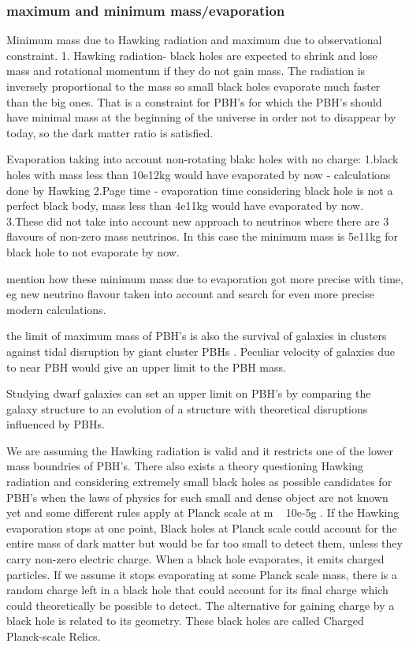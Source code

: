 \documentclass{article}
\begin{document}
\subsubsection {maximum and minimum mass/evaporation}
Minimum mass due to Hawking radiation and maximum due to observational constraint.
1. Hawking radiation- black holes are expected to shrink and lose mass and rotational momentum if they do not gain mass. The radiation is inversely proportional to the mass so small black holes evaporate much faster than the big ones. That is a constraint for PBH's for which the PBH's should have minimal mass at the beginning of the universe in order not to disappear by today, so the dark matter ratio is satisfied. 

Evaporation taking into account non-rotating blakc holes with no charge:
1.black holes with mass less than 10e12kg would have evaporated by now - calculations done by Hawking 
2.Page time - evaporation time considering black hole is not a perfect black body, mass less than 4e11kg would have evaporated by now. 
3.These did not take into account new approach to neutrinos where there are 3 flavours of non-zero mass neutrinos. In this case the minimum mass is 5e11kg for black hole to not evaporate by now. 

mention how these minimum mass due to evaporation got more precise with time, eg new neutrino flavour taken into account and search for even more precise modern calculations.

the limit of maximum mass of PBH's is also the survival of galaxies in clusters against tidal disruption by giant cluster PBHs \cite{PBH_as_DM_candidate}. Peculiar velocity of galaxies due to near PBH would give an upper limit to the PBH mass. 

Studying dwarf galaxies can set an upper limit on PBH's by comparing the galaxy structure to an evolution of a structure with theoretical disruptions influenced by PBHs. 


We are assuming the Hawking radiation is valid and it restricts one of the lower mass boundries of PBH's. There also exists a theory questioning Hawking radiation and considering extremely small black holes as possible candidates for PBH's when the laws of physics for such small and dense object are not known yet and some different rules apply at Planck scale at m ~ 10e-5g . If the Hawking evaporation stops at one point, Black holes at Planck scale could account for the entire mass of dark matter but would be far too small to detect them, unless they carry non-zero electric charge. When a black hole evaporates, it emits charged particles. If we assume it stops evaporating at some Planck scale mass, there is a random charge left in a black hole that could account for its final charge which could theoretically be possible to detect. The alternative for gaining charge by a black hole is related to its geometry. These black holes are called Charged Planck-scale Relics.  \cite{Lehmann_2019} 
\end{document}
